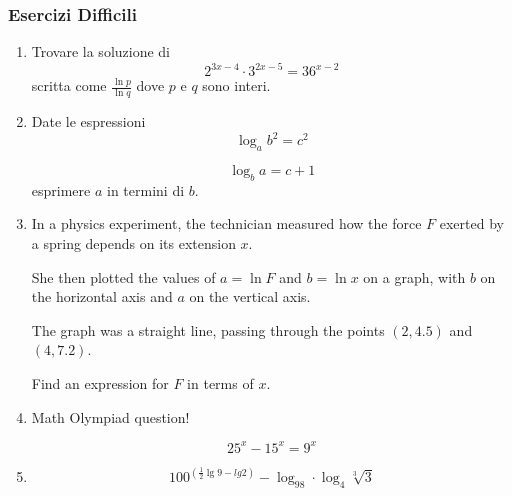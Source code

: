 \subsubsection{Esercizi Difficili}\label{subsec:eser_diff} %

\begin{enumerate} %
\item Trovare la soluzione di %
\[
2^{3x-4}\cdot3^{2x-5}=36^{x-2}
\]
scritta come $\frac{\ln p}{\ln q}$ dove $p$ e $q$ sono interi.
\item Date le espressioni %
\[
\log_a b^2=c^2
\]

\[
\log_b a = c+1
\]
esprimere $a$ in termini di $b$.
\item  %
In a physics experiment, the technician measured how the force $F$ exerted by a spring depends on its extension $x$.

She then plotted the values of $a = \ln F$ and $b = \ln x$ on a graph, with $b$ on the horizontal axis and $a$ on the vertical axis.

The graph was a straight line, passing through the points $(2, 4.5)$ and $(4, 7.2)$.

Find an expression for $F$ in terms of $x$.

\item Math Olympiad question!  

\[
25^x-15^x=9^x
\]


\item 

\[
100^{\left(\frac{1}{2}\lg9-lg2\right)}-\log_98\cdot\log_4\sqrt[3]{3}
\]



\end{enumerate} %


